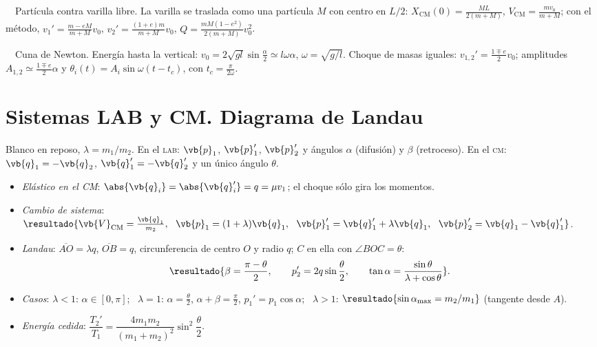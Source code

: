 \documentclass[11pt,a4paper,twoside]{article}
\newcommand{\cm}{_{\mathrm{CM}}}
\newcommand{\Vcm}{\vb{V}\cm}
\newcommand{\lab}{\textup{\textsc{lab}}}
\newcommand{\scm}{\textup{\textsc{cm}}}
\newcommand{\ej}[2]{\par\addvspace{1.2ex}\noindent{\color{cian}\bfseries P#1}\ \ {\color{tenue}#2.}\enspace\ignorespaces}
\begin{document}
\ej{4}{Partícula contra varilla libre}
La varilla se traslada como una partícula $M$ con centro en $L/2$:
$X\cm(0)=\frac{ML}{2(m+M)}$, $V\cm=\frac{mv_{0}}{m+M}$; con el método,
$v_{1}'=\frac{m-eM}{m+M}v_{0}$, $v_{2}'=\frac{(1+e)m}{m+M}v_{0}$, $Q=\frac{mM(1-e^{2})}{2(m+M)}v_{0}^{2}$.

\ej{6}{Cuna de Newton}
Energía hasta la vertical: $v_{0}=2\sqrt{gl}\sin\frac\alpha2\simeq l\omega\alpha$, $\omega=\sqrt{g/l}$. Choque de masas iguales:
$v_{1,2}'=\frac{1\mp e}{2}v_{0}$; amplitudes $A_{1,2}\simeq\frac{1\mp e}{2}\alpha$ y
$\theta_{i}(t)=A_{i}\sin\omega(t-t_{c})$, con $t_{c}=\frac{\pi}{2\omega}$.

\section{Sistemas LAB y CM. Diagrama de Landau}

Blanco en reposo, $\lambda=m_{1}/m_{2}$. En el \lab: $\vb{p}_{1}$, $\vb{p}_{1}'$, $\vb{p}_{2}'$ y ángulos $\alpha$ (difusión) y
$\beta$ (retroceso). En el \scm: $\vb{q}_{1}=-\vb{q}_{2}$, $\vb{q}_{1}'=-\vb{q}_{2}'$ y un único ángulo $\theta$.
\begin{itemize}[leftmargin=1.3em]
  \item \emph{Elástico en el CM}: $\abs{\vb{q}_{i}}=\abs{\vb{q}_{i}'}=q=\mu v_{1}$; el choque sólo gira los momentos.
  \item \emph{Cambio de sistema}:
        $\resultado{\Vcm=\frac{\vb{q}_{1}}{m_{2}},\ \ \vb{p}_{1}=(1+\lambda)\vb{q}_{1},\ \ \vb{p}_{1}'=\vb{q}_{1}'+\lambda\vb{q}_{1},\ \ \vb{p}_{2}'=\vb{q}_{1}-\vb{q}_{1}'}$.
  \item \emph{Landau}: $\overline{AO}=\lambda q$, $\overline{OB}=q$, circunferencia de centro $O$ y radio $q$; $C$ en ella con $\angle BOC=\theta$:
        \[
          \resultado{\beta=\frac{\pi-\theta}{2},\qquad p_{2}'=2q\sin\frac\theta2,\qquad \tan\alpha=\frac{\sin\theta}{\lambda+\cos\theta}} .
        \]
  \item \emph{Casos}: $\lambda<1$: $\alpha\in[0,\pi]$; \ $\lambda=1$: $\alpha=\frac\theta2$, $\alpha+\beta=\frac\pi2$,
        $p_{1}'=p_{1}\cos\alpha$; \ $\lambda>1$: $\resultado{\sin\alpha_{\max}=m_{2}/m_{1}}$ (tangente desde $A$).
  \item \emph{Energía cedida}: $\dfrac{T_{2}'}{T_{1}}=\dfrac{4m_{1}m_{2}}{(m_{1}+m_{2})^{2}}\sin^{2}\dfrac\theta2$.
\end{itemize}
\end{document}
